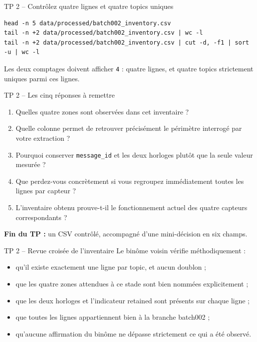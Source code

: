 \documentclass[aspectratio=169]{beamer}
\begin{document}
\begin{frame}[fragile]{TP 2 -- Contrôlez quatre lignes et quatre topics uniques}
\scriptsize
\begin{verbatim}
head -n 5 data/processed/batch002_inventory.csv
tail -n +2 data/processed/batch002_inventory.csv | wc -l
tail -n +2 data/processed/batch002_inventory.csv | cut -d, -f1 | sort -u | wc -l
\end{verbatim}
Les deux comptages doivent afficher \texttt{4} : quatre lignes, et quatre topics strictement uniques parmi ces lignes.
\end{frame}

\begin{frame}{TP 2 -- Les cinq réponses à remettre}
\small
\begin{enumerate}
\item Quelles quatre zones sont observées dans cet inventaire ?
\item Quelle colonne permet de retrouver précisément le périmètre interrogé par votre extraction ?
\item Pourquoi conserver \texttt{message\_id} et les deux horloges plutôt que la seule valeur mesurée ?
\item Que perdez-vous concrètement si vous regroupez immédiatement toutes les lignes par capteur ?
\item L'inventaire obtenu prouve-t-il le fonctionnement actuel des quatre capteurs correspondants ?
\end{enumerate}
\textbf{Fin du TP :} un CSV contrôlé, accompagné d'une mini-décision en six champs.
\end{frame}

\begin{frame}{TP 2 -- Revue croisée de l'inventaire}
Le binôme voisin vérifie méthodiquement :
\begin{itemize}
\item qu'il existe exactement une ligne par topic, et aucun doublon ;
\item que les quatre zones attendues à ce stade sont bien nommées explicitement ;
\item que les deux horloges et l'indicateur retained sont présents sur chaque ligne ;
\item que toutes les lignes appartiennent bien à la branche batch002 ;
\item qu'aucune affirmation du binôme ne dépasse strictement ce qui a été observé.
\end{itemize}
\end{frame}
\end{document}
